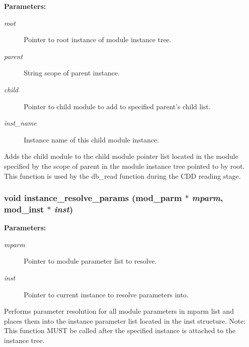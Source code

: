 \begin{Desc}
\item[{\bf Parameters: }]\par
\begin{description}
\item[
{\em root}]Pointer to root instance of module instance tree. \item[
{\em parent}]String scope of parent instance. \item[
{\em child}]Pointer to child module to add to specified parent's child list. \item[
{\em inst\_\-name}]Instance name of this child module instance.

\end{description}
\end{Desc}
Adds the child module to the child module pointer list located in the module specified by the scope of parent in the module instance tree pointed to by root. This function is used by the db\_\-read function during the CDD reading stage. 
\subsubsection{\setlength{\rightskip}{0pt plus 5cm}void instance\_\-resolve\_\-params ({\bf mod\_\-parm} $\ast$ {\em mparm}, {\bf mod\_\-inst} $\ast$ {\em inst})}\label{instance_8c_a5}


\begin{Desc}
\item[{\bf Parameters: }]\par
\begin{description}
\item[
{\em mparm}]Pointer to module parameter list to resolve. \item[
{\em inst}]Pointer to current instance to resolve parameters into.

\end{description}
\end{Desc}
Performs parameter resolution for all module parameters in mparm list and places them into the instance parameter list located in the inst structure. Note: This function MUST be called after the specified instance is attached to the instance tree. 